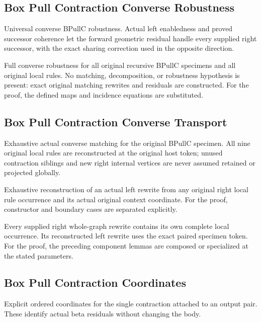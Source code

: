 \subsection{Box Pull Contraction Converse Robustness}
Universal converse BPullC robustness. Actual left enabledness and proved successor coherence let the forward geometric residual handle every supplied right successor, with the exact sharing correction used in the opposite direction.

Full converse robustness for all original recursive BPullC specimens and all original local rules. No matching, decomposition, or robustness hypothesis is present: exact original matching rewrites and residuals are constructed.
For the proof, the defined maps and incidence equations are substituted.
\par{}

\subsection{Box Pull Contraction Converse Transport}
Exhaustive actual converse matching for the original BPullC specimen. All nine original local rules are reconstructed at the original host token; unused contraction siblings and new right internal vertices are never assumed retained or projected globally.

Exhaustive reconstruction of an actual left rewrite from any original right local rule occurrence and its actual original context coordinate.
For the proof, constructor and boundary cases are separated explicitly.
\par{}

Every supplied right whole-graph rewrite contains its own complete local occurrence. Its reconstructed left rewrite uses the exact paired specimen token.
For the proof, the preceding component lemmas are composed or specialized at the stated parameters.
\par{}

\subsection{Box Pull Contraction Coordinates}
Explicit ordered coordinates for the single contraction attached to an output pair. These identify actual beta residuals without changing the body.

